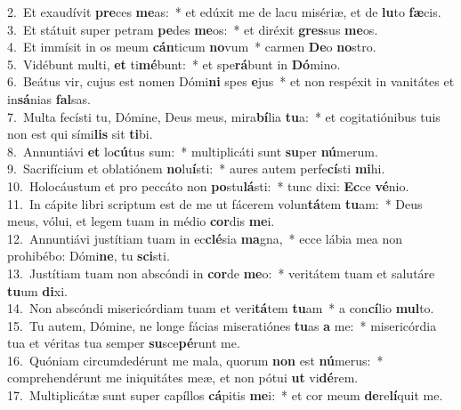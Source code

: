 {2.~}Et exaudívit \textbf{pre}ces \textbf{me}as:~* et edúxit me de lacu misériæ, et de \textbf{lu}to \textbf{fæ}cis.\\
{3.~}Et státuit super petram \textbf{pe}des \textbf{me}os:~* et diréxit \textbf{gres}sus \textbf{me}os.\\
{4.~}Et immísit in os meum \textbf{cán}ticum \textbf{no}vum~* carmen \textbf{De}o \textbf{no}stro.\\
{5.~}Vidébunt multi, \textbf{et} ti\textbf{mé}bunt:~* et spe\textbf{rá}bunt in \textbf{Dó}mino.\\
{6.~}Beátus vir, cujus est nomen Dómi\textbf{ni} spes \textbf{e}jus~* et non respéxit in vanitátes et in\textbf{sá}nias \textbf{fal}sas.\\
{7.~}Multa fecísti tu, Dómine, Deus meus, mira\textbf{bí}lia \textbf{tu}a:~* et cogitatiónibus tuis non est qui sími\textbf{lis} sit \textbf{ti}bi.\\
{8.~}Annuntiávi \textbf{et} lo\textbf{cú}tus sum:~* multiplicáti sunt \textbf{su}per \textbf{nú}merum.\\
{9.~}Sacrifícium et oblatiónem \textbf{no}lu\textbf{í}sti:~* aures autem perfe\textbf{cí}sti \textbf{mi}hi.\\
{10.~}Holocáustum et pro peccáto non \textbf{po}stu\textbf{lá}sti:~* tunc dixi: \textbf{Ec}ce \textbf{vé}nio.\\
{11.~}In cápite libri scriptum est de me ut fácerem volun\textbf{tá}tem \textbf{tu}am:~* Deus meus, vólui, et legem tuam in médio \textbf{cor}dis \textbf{me}i.\\
{12.~}Annuntiávi justítiam tuam in ec\textbf{clé}sia \textbf{ma}gna,~* ecce lábia mea non prohibébo: Dómi\textbf{ne}, tu \textbf{sci}sti.\\
{13.~}Justítiam tuam non abscóndi in \textbf{cor}de \textbf{me}o:~* veritátem tuam et salutáre \textbf{tu}um \textbf{di}xi.\\
{14.~}Non abscóndi misericórdiam tuam et veri\textbf{tá}tem \textbf{tu}am~* a con\textbf{cí}lio \textbf{mul}to.\\
{15.~}Tu autem, Dómine, ne longe fácias miseratiónes \textbf{tu}as \textbf{a} me:~* misericórdia tua et véritas tua semper \textbf{su}sce\textbf{pé}runt me.\\
{16.~}Quóniam circumdedérunt me mala, quorum \textbf{non} est \textbf{nú}merus:~* comprehendérunt me iniquitátes meæ, et non pótui \textbf{ut} vi\textbf{dé}rem.\\
{17.~}Multiplicátæ sunt super capíllos \textbf{cá}pitis \textbf{me}i:~* et cor meum \textbf{de}re\textbf{lí}quit me.\\
